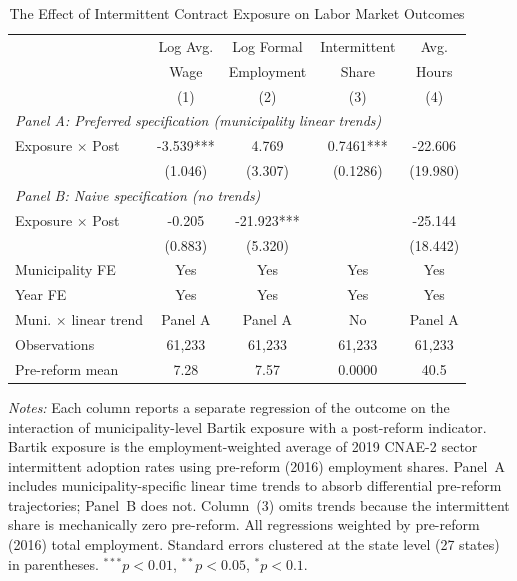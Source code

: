 \begin{table}[htbp]
\centering
\caption{The Effect of Intermittent Contract Exposure on Labor Market Outcomes}
\label{tab:main}
\begin{tabular}{lcccc}
\hline\hline
 & Log Avg. & Log Formal & Intermittent & Avg. \\
 & Wage & Employment & Share & Hours \\
 & (1) & (2) & (3) & (4) \\
\hline
\multicolumn{5}{l}{\textit{Panel A: Preferred specification (municipality linear trends)}} \\[3pt]
Exposure $\times$ Post & -3.539*** & 4.769 & 0.7461*** & -22.606 \\
 & (1.046) & (3.307) & (0.1286) & (19.980) \\
[6pt]
\multicolumn{5}{l}{\textit{Panel B: Naive specification (no trends)}} \\[3pt]
Exposure $\times$ Post & -0.205 & -21.923*** & & -25.144 \\
 & (0.883) & (5.320) & & (18.442) \\
\hline
Municipality FE & Yes & Yes & Yes & Yes \\
Year FE & Yes & Yes & Yes & Yes \\
Muni. $\times$ linear trend & Panel A & Panel A & No & Panel A \\
Observations & 61,233 & 61,233 & 61,233 & 61,233 \\
Pre-reform mean & 7.28 & 7.57 & 0.0000 & 40.5 \\
\hline\hline
\end{tabular}
\begin{tablenotes}
\item \textit{Notes:} Each column reports a separate regression of the outcome on the interaction of municipality-level Bartik exposure with a post-reform indicator. Bartik exposure is the employment-weighted average of 2019 CNAE-2 sector intermittent adoption rates using pre-reform (2016) employment shares. Panel~A includes municipality-specific linear time trends to absorb differential pre-reform trajectories; Panel~B does not. Column~(3) omits trends because the intermittent share is mechanically zero pre-reform. All regressions weighted by pre-reform (2016) total employment. Standard errors clustered at the state level (27 states) in parentheses. $^{***}p<0.01$, $^{**}p<0.05$, $^{*}p<0.1$.
\end{tablenotes}
\end{table}
